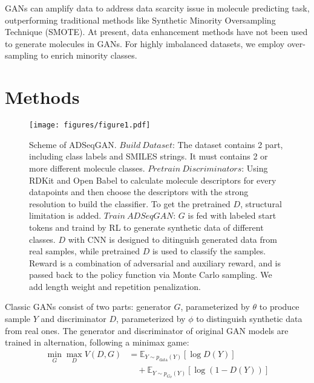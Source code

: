 \documentclass[10pt, twocolumn]{article}
\begin{document}
GANs can amplify data to address data scarcity issue in molecule predicting task\cite{arigye2020}, outperforming traditional methods like Synthetic Minority Oversampling Technique (SMOTE). At present, data enhancement methods have not been used to generate molecules in GANs. For highly imbalanced datasets, we employ over-sampling to enrich minority classes. 

\section{Methods}


\begin{figure*}[!htb]
    \centering
    \texttt{[image: figures/figure1.pdf]}
    \caption{\small Scheme of ADSeqGAN. $Build \ Dataset$: The dataset contains 2 part, including class labels and SMILES strings. It must contains 2 or more different molecule classes. $Pretrain \ Discriminators$: Using RDKit and Open Babel to calculate molecule descriptors for every datapoints and then choose the descriptors with the strong resolution to build the classifier. To get the pretrained $D$, structural limitation is added. $Train \ ADSeqGAN$: $G$ is fed with labeled start tokens and traind by RL to generate synthetic data of different classes. $D$ with CNN is designed to ditinguish generated data from real samples, while pretrained $D$ is used to classify the samples. Reward is a combination of adversarial and auxiliary reward, and is passed back to the policy function via Monte Carlo
sampling. We add length weight and repetition penalization.}
    \label{fig:fig1}
\end{figure*}


Classic GANs consist of two parts: generator $G$, parameterized by $\theta$ to produce sample $Y$ and discriminator $D$, parameterized by $\phi$ to distinguish synthetic data from real ones. The generator and discriminator of original GAN models are trained in alternation, following a minimax game:
\begin{equation}
\begin{aligned}
\min_{G}\max_{D}V(D,G) &= \mathbb{E}_{Y \sim p_{\text{data}}(Y)}[\log D(Y)] \\
&\quad + \mathbb{E}_{Y \sim p_{G_{\theta}}(Y)}[\log (1-D(Y))]
\end{aligned}
\tag{1}
\end{equation}
\end{document}
